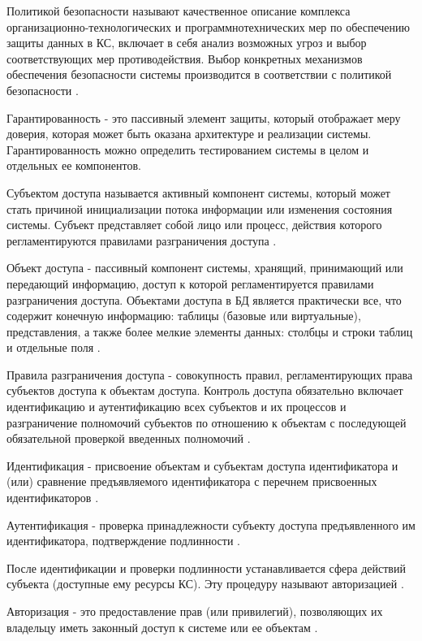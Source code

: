 Политикой безопасности называют качественное описание комплекса организационно-технологических и программнотехнических мер по обеспечению защиты данных в КС, включает в себя анализ возможных угроз и выбор соответствующих мер противодействия. Выбор конкретных механизмов обеспечения безопасности системы производится в соответствии с политикой безопасности \autocite[сс. 15-18]{Skakun}.

Гарантированность - это пассивный элемент защиты, который отображает меру доверия, которая может быть оказана архитектуре и реализации системы. Гарантированность можно определить тестированием системы в целом и отдельных ее компонентов.

Субъектом доступа называется активный компонент системы, который может стать причиной инициализации потока информации или изменения состояния системы. Субъект представляет собой лицо или процесс, действия которого регламентируются правилами разграничения доступа \autocite[сс. 15-18]{Skakun}. 

Объект доступа - пассивный компонент системы, хранящий, принимающий или передающий информацию, доступ к которой регламентируется правилами разграничения доступа. Объектами доступа в БД является практически все, что содержит конечную информацию: таблицы (базовые или виртуальные), представления, а также более мелкие элементы данных: столбцы и строки таблиц и отдельные поля \autocite[сс. 15-18]{Skakun}. 

Правила разграничения доступа - совокупность правил, регламентирующих права субъектов доступа к объектам доступа. Контроль доступа обязательно включает идентификацию и аутентификацию всех субъектов и их процессов и разграничение полномочий субъектов по отношению к объектам с последующей обязательной проверкой введенных полномочий \autocite[сс. 15-18]{Skakun}.

Идентификация - присвоение объектам и субъектам доступа идентификатора и (или) сравнение предъявляемого идентификатора с перечнем присвоенных идентификаторов \autocite[сс. 15-18]{Skakun}. 

Аутентификация  - проверка принадлежности субъекту доступа предъявленного им идентификатора, подтверждение подлинности \autocite[сс. 15-18]{Skakun}. 

После идентификации и проверки подлинности устанавливается сфера действий субъекта (доступные ему ресурсы КС). Эту процедуру называют авторизацией \autocite[сс. 15-18]{Skakun}.

Авторизация - это предоставление прав (или привилегий), позволяющих их владельцу иметь законный доступ к системе или ее объектам \autocite[сс. 15-18]{Skakun}. 

